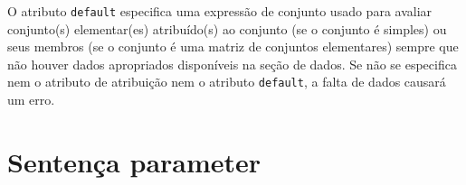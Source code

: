 \documentclass[11pt, brazil]{report}
\begin{document}
O atributo {\tt default} especifica uma expressão de conjunto usado para
avaliar conjunto(s) \linebreak elementar(es) atribuído(s) ao conjunto
(se o conjunto é simples) ou seus membros (se o conjunto é uma matriz
de conjuntos elementares) sempre que não houver dados apropriados
disponíveis na seção de dados. Se não se especifica nem o atributo de
atribuição nem o atributo {\tt default}, a falta de dados causará um erro.

%
%
%
%

\newpage

\section{Sentença parameter}
\end{document}
